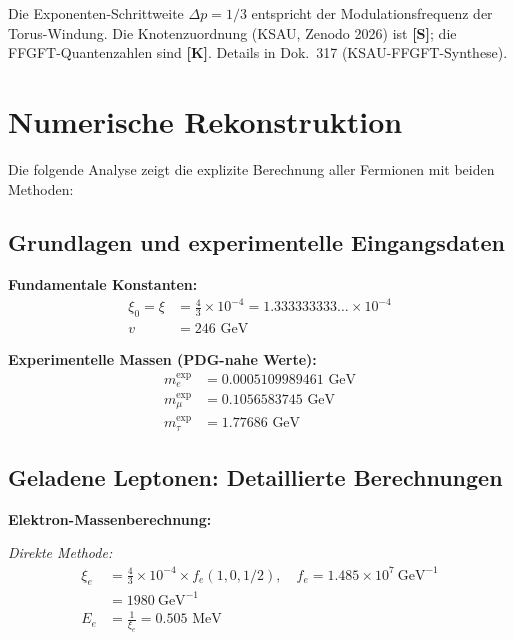 Die Exponenten-Schrittweite $\Delta p = 1/3$ entspricht der
Modulationsfrequenz der Torus-Windung. Die Knotenzuordnung (KSAU,
Zenodo 2026) ist \textbf{[S]}; die FFGFT-Quantenzahlen sind
\textbf{[K]}. Details in Dok.~317 (KSAU-FFGFT-Synthese).



\section{Numerische Rekonstruktion}
\label{sec:complete_numerical_reconstruction}

Die folgende Analyse zeigt die explizite Berechnung aller Fermionen mit beiden Methoden:

\subsection{Grundlagen und experimentelle Eingangsdaten}
\label{subsec:foundations}

\textbf{Fundamentale Konstanten:}
\begin{align}
	\xi_0 = \xi &= \frac{4}{3} \times 10^{-4} = 1.333333333\ldots \times 10^{-4} \\
	v &= 246 \text{ GeV}
\end{align}

\textbf{Experimentelle Massen (PDG-nahe Werte):}
\begin{align}
	m_e^{\text{exp}} &= 0.0005109989461 \text{ GeV} \\
	m_\mu^{\text{exp}} &= 0.1056583745 \text{ GeV} \\
	m_\tau^{\text{exp}} &= 1.77686 \text{ GeV}
\end{align}

\subsection{Geladene Leptonen: Detaillierte Berechnungen}
\label{subsec:charged_leptons_detailed}

\textbf{Elektron-Massenberechnung:}

\textit{Direkte Methode:}
\begin{align}
			\xi_e &= \frac{4}{3} \times 10^{-4} \times f_e(1,0,1/2), \quad f_e = 1.485 \times 10^{7}\ \text{GeV}^{-1} \\
		&= 1980\ \text{GeV}^{-1} \\
		E_{e} &= \frac{1}{\xi_e} = 0.505 \text{ MeV}
\end{align}

